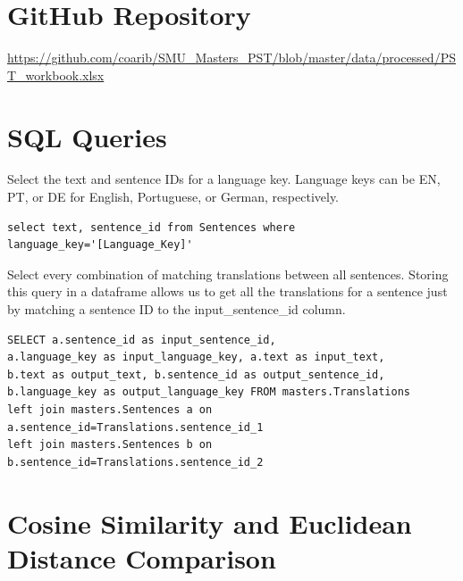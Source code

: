 \documentclass[runningheads]{llncs}
\begin{document}
\appendix

\section{GitHub Repository}
	\url{https://github.com/coarib/SMU_Masters_PST/blob/master/data/processed/PST_workbook.xlsx}

\section{SQL Queries}
Select the text and sentence IDs for a language key. Language keys can be EN, PT, or DE for English, Portuguese, or German, respectively. 

\begin{verbatim}
select text, sentence_id from Sentences where language_key='[Language_Key]'
\end{verbatim}
Select every combination of matching translations between all sentences. Storing this query in a dataframe allows us to get all the translations for a sentence just by matching a sentence ID to the input\_sentence\_id column.

\begin{verbatim}
SELECT a.sentence_id as input_sentence_id, 
a.language_key as input_language_key, a.text as input_text, 
b.text as output_text, b.sentence_id as output_sentence_id, 
b.language_key as output_language_key FROM masters.Translations 
left join masters.Sentences a on a.sentence_id=Translations.sentence_id_1 
left join masters.Sentences b on b.sentence_id=Translations.sentence_id_2
\end{verbatim}

\section{Cosine Similarity and Euclidean Distance Comparison}
\hypertarget{Appendix C}{}
\end{document}
